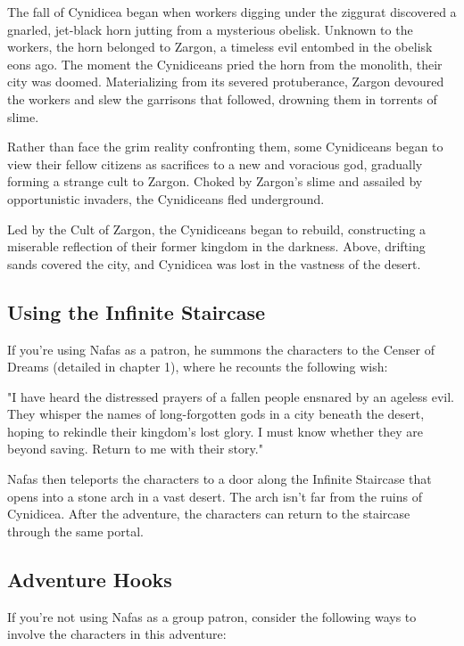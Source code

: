 \documentclass[10pt,a4paper,twoside,bg=print,twocolumn,openany,nodeprecatedcode]{dndbook}
\begin{document}
The fall of Cynidicea began when workers digging under the ziggurat discovered a gnarled, jet-black horn jutting from a mysterious obelisk. Unknown to the workers, the horn belonged to Zargon, a timeless evil entombed in the obelisk eons ago. The moment the Cynidiceans pried the horn from the monolith, their city was doomed. Materializing from its severed protuberance, Zargon devoured the workers and slew the garrisons that followed, drowning them in torrents of slime.

Rather than face the grim reality confronting them, some Cynidiceans began to view their fellow citizens as sacrifices to a new and voracious god, gradually forming a strange cult to Zargon. Choked by Zargon's slime and assailed by opportunistic invaders, the Cynidiceans fled underground.

Led by the Cult of Zargon, the Cynidiceans began to rebuild, constructing a miserable reflection of their former kingdom in the darkness. Above, drifting sands covered the city, and Cynidicea was lost in the vastness of the desert.

\subsection{Using the Infinite Staircase}
If you're using Nafas as a patron, he summons the characters to the Censer of Dreams (detailed in chapter 1), where he recounts the following wish:

\begin{DndReadAloud}{}
"I have heard the distressed prayers of a fallen people ensnared by an ageless evil. They whisper the names of long-forgotten gods in a city beneath the desert, hoping to rekindle their kingdom's lost glory. I must know whether they are beyond saving. Return to me with their story."

\end{DndReadAloud}

Nafas then teleports the characters to a door along the Infinite Staircase that opens into a stone arch in a vast desert. The arch isn't far from the ruins of Cynidicea. After the adventure, the characters can return to the staircase through the same portal.

\subsection{Adventure Hooks}
If you're not using Nafas as a group patron, consider the following ways to involve the characters in this adventure:
\end{document}
